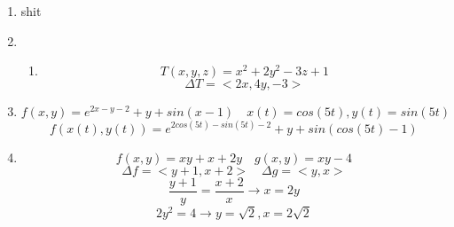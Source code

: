 \documentclass[12pt]{article}
\begin{document}
\maketitle \begin{enumerate}

\item shit

\item \begin{enumerate}
\item 
$$T(x, y, z) = x^2 +2y^2 - 3z + 1$$
$$\Delta T  = <2x, 4y, -3>$$

\end{enumerate}

\item $$f(x, y) = e^{2x-y-2}+y+sin(x-1) \quad x(t) = cos(5t), y(t) = sin(5t)$$
$$f(x(t), y(t)) = e^{2cos(5t)-sin(5t)-2}+y+sin(cos(5t)-1)$$

\item $$f(x, y) = xy + x + 2y \quad g(x, y) = xy - 4$$
$$\Delta f = <y+1,x+2> \quad \Delta g = <y, x>$$
$$\frac{y+1}{y} = \frac{x+2}{x} \rightarrow x=2y$$
$$2y^2=4 \rightarrow y=\sqrt{2}, x = 2\sqrt{2}$$

\end{enumerate} 
\end{document}
